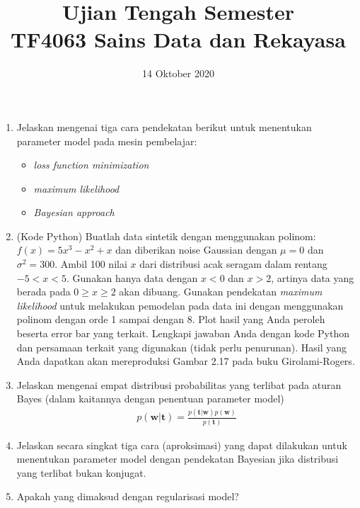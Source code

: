 \documentclass[a4paper,11pt]{article} %
\begin{document}
\title{Ujian Tengah Semester \\
TF4063 Sains Data dan Rekayasa}
\author{}
\date{14 Oktober 2020}
\maketitle

\begin{enumerate}
%
\item Jelaskan mengenai tiga cara pendekatan berikut untuk menentukan parameter model
pada mesin pembelajar:
  \begin{itemize}
  \item \textit{loss function minimization}
  \item \textit{maximum likelihood}
  \item \textit{Bayesian approach}
  \end{itemize}
%
\item (Kode Python) Buatlah data sintetik dengan menggunakan polinom: $f(x)=5x^3 - x^2 + x$ dan
diberikan noise Gaussian dengan $\mu=0$ dan $\sigma^2=300$. Ambil 100 nilai $x$
dari distribusi acak seragam dalam rentang $-5 < x < 5$. Gunakan hanya data dengan
$x < 0$ dan $x > 2$, artinya data yang berada pada $0 \geq x \geq 2$ akan dibuang.
Gunakan pendekatan \textit{maximum likelihood} untuk melakukan pemodelan pada data
ini dengan menggunakan polinom dengan orde 1 sampai dengan 8. Plot hasil yang Anda
peroleh beserta error bar yang terkait. Lengkapi jawaban Anda dengan kode Python
dan persamaan terkait yang digunakan (tidak perlu penurunan). Hasil yang Anda dapatkan
akan mereproduksi Gambar 2.17 pada buku Girolami-Rogers.
%
\item Jelaskan mengenai empat distribusi probabilitas yang terlibat
pada aturan Bayes (dalam kaitannya
dengan penentuan parameter model)
\begin{align}
p(\mathbf{w} | \mathbf{t}) = 
\frac{p(\mathbf{t}|\mathbf{w}) p(\mathbf{w})}{p(\mathbf{t})}
\end{align}
%
\item Jelaskan secara singkat tiga cara (aproksimasi) yang dapat dilakukan
untuk menentukan parameter model dengan pendekatan Bayesian jika distribusi
yang terlibat bukan konjugat.
%
\item Apakah yang dimaksud dengan regularisasi model? 
\end{enumerate}
\end{document}
